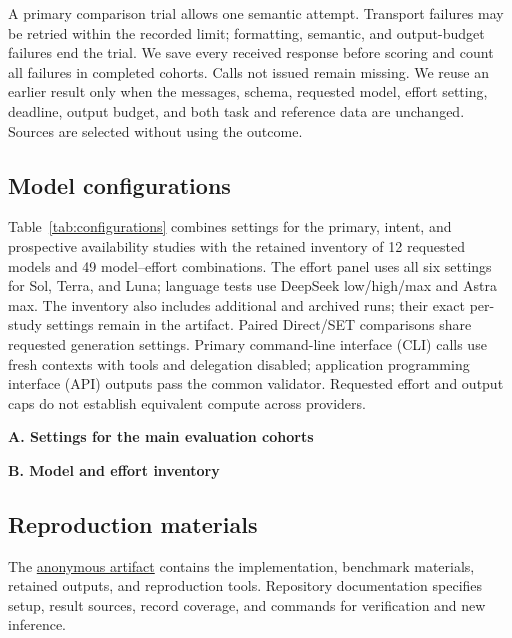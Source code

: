 A primary comparison trial allows one semantic attempt. Transport failures may be retried within the recorded limit; formatting, semantic, and output-budget failures end the trial. We save every received response before scoring and count all failures in completed cohorts. Calls not issued remain missing. We reuse an earlier result only when the messages, schema, requested model, effort setting, deadline, output budget, and both task and reference data are unchanged. Sources are selected without using the outcome.

\subsection{Model configurations}
\label{app:model-configurations}
\label{app:qwen}
\label{app:primary-extensions}
Table~\ref{tab:configurations} combines settings for the primary, intent, and prospective availability studies with the retained inventory of 12 requested models and 49 model--effort combinations. The effort panel uses all six settings for Sol, Terra, and Luna; language tests use DeepSeek low/high/max and Astra max. The inventory also includes additional and archived runs; their exact per-study settings remain in the artifact. Paired Direct/SET comparisons share requested generation settings. Primary command-line interface (CLI) calls use fresh contexts with tools and delegation disabled; application programming interface (API) outputs pass the common validator. Requested effort and output caps do not establish equivalent compute across providers.

\begin{table}[p]
\centering\fontsize{9}{10.5}\selectfont
\setlength{\tabcolsep}{4pt}
\textbf{A. Settings for the main evaluation cohorts}\par\smallskip

\par\medskip
\textbf{B. Model and effort inventory}\par\smallskip

\caption{Requested models and generation settings. Caps are in tokens and deadlines in seconds. Panel A gives cohort settings; each primary configuration uses 200 tasks per method, intent counts appear in Table~\ref{tab:intent-figure3}, and availability follows Appendix~\ref{app:availability}. Panel B lists the 49 model--effort combinations in the retained inventory; its caps and deadlines summarize primary, sensitivity, and archived runs, not all possible pairings. Names denote requested configurations, not independently attested backend versions.}
\label{tab:configurations}
\label{tab:configurations-extended}
\end{table}

\subsection{Reproduction materials}
\label{app:reproduction}
The \href{https://anonymous.4open.science/r/risk-aware-payment-delegation-D4FC/}{anonymous artifact} contains the implementation, benchmark materials, retained outputs, and reproduction tools. Repository documentation specifies setup, result sources, record coverage, and commands for verification and new inference.
